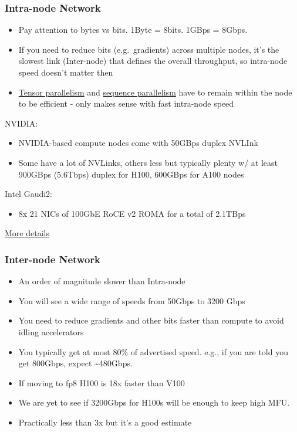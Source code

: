 \documentclass[
]{report}
\providecommand{\tightlist}{%
  \setlength{\itemsep}{0pt}\setlength{\parskip}{0pt}}\usepackage{longtable,booktabs,array}
\begin{document}
\subsubsection{Intra-node Network}\label{intra-node-network}

\begin{itemize}
\item
  Pay attention to bytes vs bits. 1Byte = 8bits. 1GBps = 8Gbps.
\item
  If you need to reduce bits (e.g.~gradients) across multiple nodes,
  it's the slowest link (Inter-node) that defines the overall
  throughput, so intra-node speed doesn't matter then
\item
  \href{../training/model-parallelism\#tensor-parallelism}{Tensor
  parallelism} and
  \href{../training/model-parallelism\#sequence-parallelism}{sequence
  parallelism} have to remain within the node to be efficient - only
  makes sense with fast intra-node speed
\end{itemize}

NVIDIA:

\begin{itemize}
\item
  NVIDIA-based compute nodes come with 50GBps duplex NVLInk
\item
  Some have a lot of NVLinks, others less but typically plenty w/ at
  least 900GBps (5.6Tbps) duplex for H100, 600GBps for A100 nodes
\end{itemize}

Intel Gaudi2:

\begin{itemize}
\tightlist
\item
  8x 21 NICs of 100GbE RoCE v2 ROMA for a total of 2.1TBps
\end{itemize}

\href{../network/README.md\#intra-node-networking}{More details}

\subsubsection{Inter-node Network}\label{inter-node-network}

\begin{itemize}
\item
  An order of magnitude slower than Intra-node
\item
  You will see a wide range of speeds from 50Gbps to 3200 Gbps
\item
  You need to reduce gradients and other bits faster than compute to
  avoid idling accelerators
\item
  You typically get at most 80\% of advertised speed. e.g., if you are
  told you get 800Gbps, expect \textasciitilde480Gbps.
\item
  If moving to fp8 H100 is 18x faster than V100
\item
  We are yet to see if 3200Gbps for H100s will be enough to keep high
  MFU.
\item
  Practically less than 3x but it's a good estimate
\end{itemize}
\end{document}
